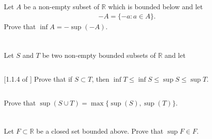 \documentclass[11pt,letterpaper]{article}
\begin{document}
\section{}
Let $A$ be a non-empty subset of $\mathbb{R}$ which is bounded below and let
\begin{align}
    -A = \{-a:a\in A\}.
\end{align}
Prove that $\inf A = -\sup(-A)$.

\section{}
Let $S$ and $T$ be two non-empty bounded subsets of $\mathbb{R}$ and let

\subsection{} [1.1.4 of \cite{Lebl_23}] Prove that if $S \subset T$, then $\inf T \leq \inf S \leq \sup S \leq \sup T$.

\subsection{} Prove that $\sup(S\cup T) = \max\{\sup(S),\sup(T)\}$. 


\section{}
Let $F\subset \mathbb{R}$ be a closed set bounded above. Prove that $\sup F\in F$.

\section{}
\end{document}
